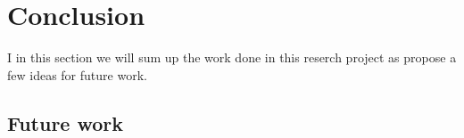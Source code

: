 
\section{Conclusion}


I in this section we will sum up the work done in this reserch project as propose a few ideas for future work.

\subsection{Future work}